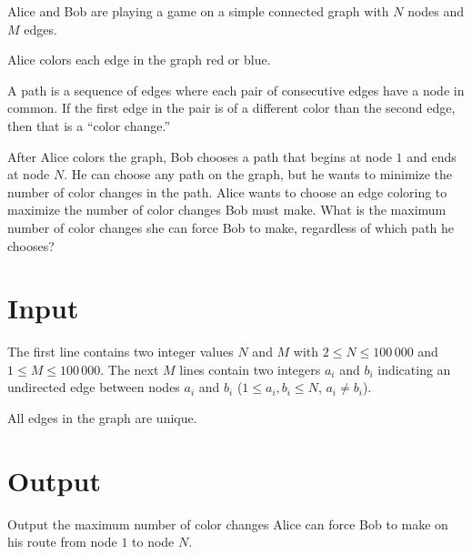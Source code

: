 
\ifdefined\pacnw
{}
\else
{}
\fi

\noindent
Alice and Bob are playing a game on a simple connected graph with $N$
nodes and $M$ edges.

Alice colors each edge in the graph red or blue.

A path is a sequence of edges where each pair of consecutive edges have a
node in common.
If the first edge in the pair is of a different color than the second
edge, then that is a ``color change.''

After Alice colors the graph,
Bob chooses a path that begins at node $1$ and ends at node $N$. He can
choose any path on the graph, but he wants to minimize
the number of color changes in the path. Alice wants to choose an edge coloring
to maximize the number of color changes Bob must make.
What is the maximum number of color
changes she can force Bob to make, regardless of which path he chooses?

\section*{Input}

The first line contains two integer values $N$ and $M$ with $2 \le N \le
100\,000$ and $1 \le M \le 100\,000$. The next $M$ lines contain two integers
$a_i$ and $b_i$ indicating an undirected edge between nodes $a_i$ and $b_i$ ($1
\le a_i, b_i \le N$, $a_i \not= b_i$).

All edges in the graph are unique.

\section*{Output}

Output the maximum number of color changes Alice can force Bob to make on his
route from node $1$ to node $N$.
